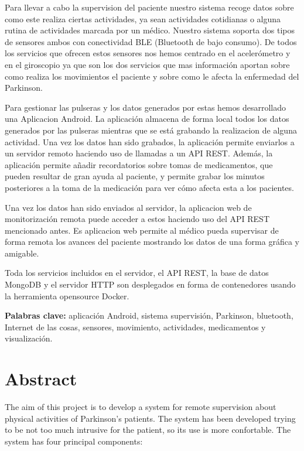 \documentclass[11pt,spanish]{article}
\newcommand\blankpage{%
    \null
    \thispagestyle{empty}%
    \addtocounter{page}{-1}%
    \newpage}
\begin{document}
Para llevar a cabo la supervision del paciente nuestro sistema recoge datos sobre como este realiza ciertas actividades, ya sean actividades cotidianas o alguna rutina de actividades marcada por un médico. Nuestro sistema soporta dos tipos de sensores ambos con conectividad BLE (Bluetooth de bajo consumo). De todos los servicios que ofrecen estos sensores nos hemos centrado en el acelerómetro y en el giroscopio ya que son los dos servicios que mas información aportan sobre como realiza los movimientos el paciente y sobre como le afecta la enfermedad del Parkinson.
\newline

Para gestionar las pulseras y los datos generados por estas hemos desarrollado una Aplicacion Android. La aplicación almacena de forma local todos los datos generados por las pulseras mientras que se está grabando la realizacion de alguna actividad. Una vez los datos han sido grabados, la aplicación permite enviarlos a un servidor remoto haciendo uso de llamadas a un API REST. Además, la aplicación permite añadir recordatorios sobre tomas de medicamentos, que pueden resultar de gran ayuda al paciente, y permite grabar los minutos posteriores a la toma de la medicación para ver cómo afecta esta a los pacientes.
\newline

Una vez los datos han sido enviados al servidor, la aplicacion web de monitorización remota puede acceder a estos haciendo uso del API REST mencionado antes. Es aplicacion web permite al médico pueda supervisar de forma remota los avances del paciente mostrando los datos de una forma gráfica y amigable.
\newline

Toda los servicios incluidos en el servidor, el API REST, la base de datos MongoDB y el servidor HTTP son desplegados en forma de contenedores usando la herramienta opensource Docker.
\newline

{\bf Palabras clave:} aplicación Android, sistema supervisión, Parkinson, bluetooth, Internet de las cosas, sensores, movimiento, actividades, medicamentos y visualización.
\newpage

\blankpage

\section*{Abstract}
The aim of this project is to develop a system for remote supervision about physical activities of Parkinson's patients. The system has been developed trying to be not too much intrusive for the patient, so its use is more confortable. The system has four principal components:
\end{document}
